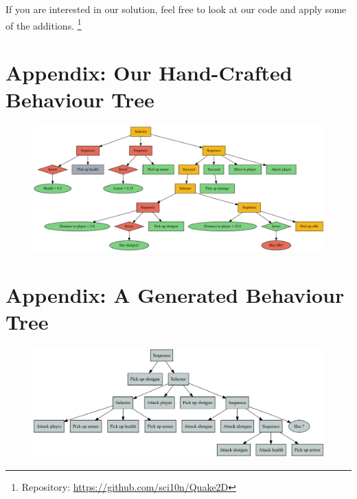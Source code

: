 \documentclass[a4paper, twocolumn]{article}
\begin{document}
    If you are interested in our solution, feel free to look at our code and apply some of the additions. \footnote{Repository: \url{https://github.com/sci10n/Quake2D}}

    \clearpage

    \nocite{*} %
    
    

    \onecolumn
    \clearpage


    \appendix

    \section{Appendix: Our Hand-Crafted Behaviour Tree} \label{app:hand_crafted}

    \begin{figure}[H]
        \centering
        \includegraphics[angle=90,height=0.92\textheight]{share/hand_crafted_behaviour_tree.pdf}
    \end{figure}

    \section{Appendix: A Generated Behaviour Tree} \label{app:generated}

    \begin{figure}[H]
        \centering
        \includegraphics[angle=90,height=0.92\textheight]{share/tree-fitness-3780.png}
    \end{figure}
\end{document}
